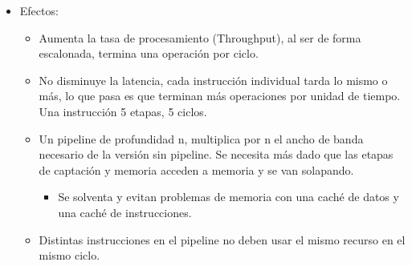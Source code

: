 \documentclass[12pt, twoside, openright]{report} %
\begin{document}
  \begin{itemize}
  
  \item
    Efectos:

    \begin{itemize}
    
    \item
      Aumenta la tasa de procesamiento (Throughput), al ser de forma
      escalonada, termina una operación por ciclo.
    \item
      No disminuye la latencia, cada instrucción individual tarda lo
      mismo o más, lo que pasa es que terminan más operaciones por
      unidad de tiempo. Una instrucción 5 etapas, 5 ciclos.
    \item
      Un pipeline de profundidad n, multiplica por n el ancho de banda
      necesario de la versión sin pipeline. Se necesita más dado que las
      etapas de captación y memoria acceden a memoria y se van
      solapando.

      \begin{itemize}
      
      \item
        Se solventa y evitan problemas de memoria con una caché de datos
        y una caché de instrucciones.
      \end{itemize}
    \item
      Distintas instrucciones en el pipeline no deben usar el mismo
      recurso en el mismo ciclo.

      \begin{itemize}
      

\end{itemize}
\end{itemize}
\end{itemize}
\end{document}
